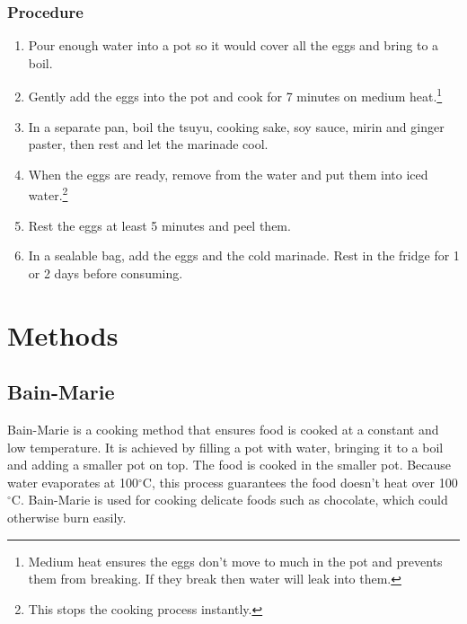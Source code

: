 \documentclass[10pt]{book}
\newcommand{\degree}{$^\circ$}
\begin{document}
\subsection*{Procedure}
	\begin{enumerate}
		\item Pour enough water into a pot so it would cover all the eggs and bring to a boil.
		\item Gently add the eggs into the pot and cook for 7 minutes on medium heat.\footnote{Medium heat ensures the eggs don't move to much in the pot and prevents them from breaking. If they break then water will leak into them.}
		\item In a separate pan, boil the tsuyu, cooking sake, soy sauce, mirin and ginger paster, then rest and let the marinade cool.
		\item When the eggs are ready, remove from the water and put them into iced water.\footnote{This stops the cooking process instantly.}
		\item Rest the eggs at least 5 minutes and peel them.
		\item In a sealable bag, add the eggs and the cold marinade. Rest in the fridge for 1 or 2 days before consuming.
	\end{enumerate}
\newpage


\newpage
\chapter*{Methods}

\newpage
\section*{Bain-Marie}

\indent\indent Bain-Marie is a cooking method that ensures food is cooked at a constant and low temperature. It is achieved by filling a pot with water, bringing it to a boil and adding a smaller pot on top. The food is cooked in the smaller pot. Because water evaporates at 100{\degree}C, this process guarantees the food doesn't heat over 100{\degree}C. Bain-Marie is used for cooking delicate foods such as chocolate, which could otherwise burn easily.
\end{document}
